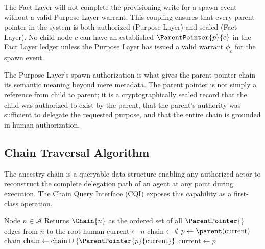 The Fact Layer will not complete the provisioning write for a spawn event without a valid Purpose Layer warrant. This coupling ensures that every parent pointer in the system is both authorized (Purpose Layer) and sealed (Fact Layer). No child node $c$ can have an established $\ParentPointer{p}{c}$ in the Fact Layer ledger unless the Purpose Layer has issued a valid warrant $\phi_c$ for the spawn event.

The Purpose Layer's spawn authorization is what gives the parent pointer chain its semantic meaning beyond mere metadata. The parent pointer is not simply a reference from child to parent; it is a cryptographically sealed record that the child was authorized to exist by the parent, that the parent's authority was sufficient to delegate the requested purpose, and that the entire chain is grounded in human authorization.

\subsection{Chain Traversal Algorithm}
\label{sec:chain_traversal}

The ancestry chain is a queryable data structure enabling any authorized actor to reconstruct the complete delegation path of an agent at any point during execution. The Chain Query Interface (CQI) exposes this capability as a first-class operation.

\begin{algorithm}[htbp]
\caption{Chain-Traverse($n$)}
\label{alg:chain_traverse}
\begin{algorithmic}[1]
\Require Node $n \in \mathcal{A}$
\Ensure Returns $\Chain{n}$ as the ordered set of all $\ParentPointer{}$ edges from $n$ to the root human
\State $\text{current} \gets n$
\State $\text{chain} \gets \emptyset$
\Loop
    \State $p \gets \parent(\text{current})$
        \State \Return $\text{chain}$ 
    \EndIf
    \State $\text{chain} \gets \text{chain} \cup \{\ParentPointer{p}{\text{current}}\}$
    \State $\text{current} \gets p$
\EndLoop
\end{algorithmic}
\end{algorithm}

